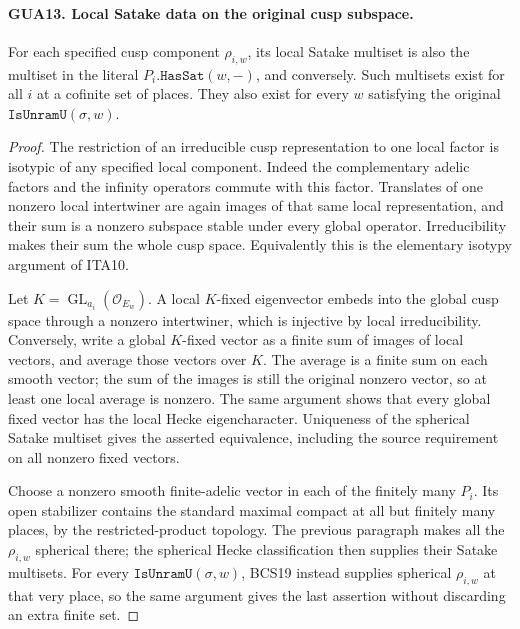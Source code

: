 \paragraph{GUA13. Local Satake data on the original cusp subspace.}
\label{claim:GUA13}
For each specified cusp component $\rho_{i,w}$, its
local Satake multiset is also the multiset in the literal
$P_i.\texttt{HasSat}(w,-)$, and conversely.  Such
multisets exist for all $i$ at a cofinite set of places.
They also exist for every $w$ satisfying the original
$\texttt{IsUnramU}(\sigma,w)$.
\begin{proof}
The restriction of an irreducible cusp representation to
one local factor is isotypic of any specified local
component.  Indeed the complementary adelic factors
and the infinity operators commute with this factor.
Translates of one nonzero local intertwiner are again
images of that same local representation, and their
sum is a nonzero subspace stable under every global
operator.  Irreducibility makes their sum the whole
cusp space.  Equivalently this is the elementary
isotypy argument of ITA10.

Let $K=\operatorname{GL}_{a_i}(\mathcal O_{E_w})$.
A local $K$-fixed eigenvector embeds into the global
cusp space through a nonzero intertwiner, which is
injective by local irreducibility.  Conversely, write
a global $K$-fixed vector as a finite sum of images
of local vectors, and average those vectors over $K$.
The average is a finite sum on each smooth vector;
the sum of the images is still the original nonzero
vector, so at least one local average is nonzero.
The same argument shows that every global fixed
vector has the local Hecke eigencharacter.  Uniqueness
of the spherical Satake multiset gives the asserted
equivalence, including the source requirement on all
nonzero fixed vectors.

Choose a nonzero smooth finite-adelic vector in each
of the finitely many $P_i$.  Its open stabilizer contains
the standard maximal compact at all but finitely many
places, by the restricted-product topology.  The
previous paragraph makes all the $\rho_{i,w}$
spherical there; the spherical Hecke classification
then supplies their Satake multisets.  For every
$\texttt{IsUnramU}(\sigma,w)$, BCS19 instead supplies spherical $\rho_{i,w}$
at that very place, so the same argument gives the
last assertion without discarding an extra finite set.
\end{proof}

